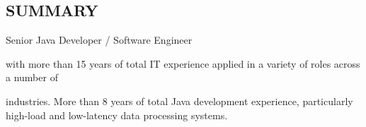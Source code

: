 \documentclass{res}
\newif\ifFullVersion
\begin{document}
\begin{resume}

\section{SUMMARY}
\vspace{1pt} %
\ifFullVersion
\noindent Team Lead / Principal Software Developer
\else
\noindent Senior Java Developer / Software Engineer
\fi
with more than 15 years of total IT experience applied in a variety of roles across a number of
\ifFullVersion
 industries: Finance, Web Security, Oil \& Gas, Utilities, Public Safety and Banking. Strong engineering background, working knowledge and proven skills in all stages of the software development lifecycle.\\
\indent More than 5~years of team leading experience, able to interact well at all levels and articulate the IT-specific issues to non-IT colleagues in a clear business-transparent way. Praised for the ability to translate the complex functional and non-functional requirements into simple, convenient for implementation and testing architecture.\\
\indent Looking for a challenging role where my skills and qualifications will add value and make a significant contribution to the company.
\else
industries. More than 8 years of total Java development experience, particularly high-load and low-latency data processing systems.
\fi

\ifFullVersion

\end{resume}
\end{document}
